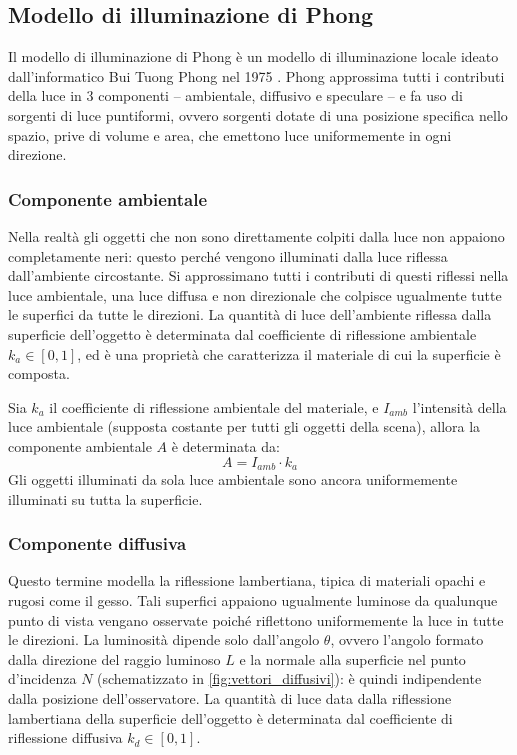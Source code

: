 \subsection{Modello di illuminazione di Phong}
Il modello di illuminazione di Phong è un modello di illuminazione locale ideato dall'informatico Bui Tuong Phong nel 1975 \cite{Phong_1975}.
Phong approssima tutti i contributi della luce in 3 componenti -- ambientale, diffusivo e speculare -- e fa uso di sorgenti di luce puntiformi, ovvero sorgenti dotate di una posizione specifica nello spazio, prive di volume e area, che emettono luce uniformemente in ogni direzione.

\subsubsection{Componente ambientale}
Nella realtà gli oggetti che non sono direttamente colpiti dalla luce non appaiono completamente neri: questo perché vengono illuminati dalla luce riflessa dall'ambiente circostante.
Si approssimano tutti i contributi di questi riflessi nella luce ambientale, una luce diffusa e non direzionale che colpisce ugualmente tutte le superfici da tutte le direzioni.
La quantità di luce dell'ambiente riflessa dalla superficie dell'oggetto è determinata dal coefficiente di riflessione ambientale  $k_a \in [0, 1]$, ed è una proprietà che caratterizza il materiale di cui la superficie è composta.

Sia $k_a$ il coefficiente di riflessione ambientale del materiale, e $I_{amb}$ l'intensità della luce ambientale (supposta costante per tutti gli oggetti della scena), allora la componente ambientale $A$ è determinata da:
\[
    A = I_{amb} \cdot k_a
\]
Gli oggetti illuminati da sola luce ambientale sono ancora uniformemente illuminati su tutta la superficie.

\subsubsection{Componente diffusiva}
Questo termine modella la riflessione lambertiana, tipica di materiali opachi e rugosi come il gesso.
Tali superfici appaiono ugualmente luminose da qualunque punto di vista vengano osservate poiché riflettono uniformemente la luce in tutte le direzioni.
La luminosità dipende solo dall'angolo $\theta$, ovvero l'angolo formato dalla direzione del raggio luminoso $L$ e la normale alla superficie nel punto d'incidenza $N$ (schematizzato in \cref{fig:vettori_diffusivi}): è quindi indipendente dalla posizione dell'osservatore.
La quantità di luce data dalla riflessione lambertiana della superficie dell'oggetto è determinata dal coefficiente di riflessione diffusiva $k_d \in [0, 1]$.

